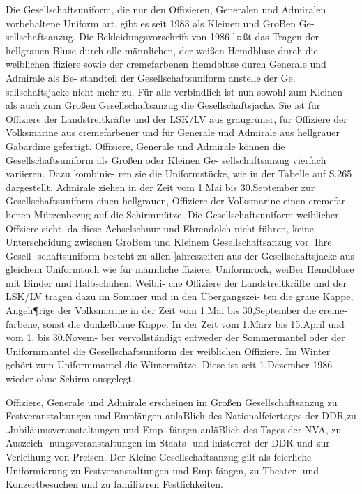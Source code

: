 

Die Gesellschaftsuniform, die nur den Offizieren,
Generalen und Admiralen vorbehaltene Uniform
art, gibt es seit 1983 als Kleinen und GroBen Ge-
sellschaftsanzug. Die Bekleidungsvorschrift von 1986 l¤ßt das Tragen der hellgrauen Bluse durch
alle männlichen, der weißen Hemdbluse durch die
weiblichen ffiziere sowie der cremefarbenen
Hemdbluse durch Generale und Admirale als Be-
standteil der Gesellschaftsuniform anstelle der Ge.
sellschaftsjacke nicht mehr zu. Für alle verbindlich
ist nun sowohl zum Kleinen als auch zum Großen
Gesellschaftsanzug die Gesellschaftsjacke. Sie ist
für Offiziere der Landstreitkräfte und der LSK/LV
aus graugrüner, für Offiziere der Volksmarine aus
cremefarbener und für Generale und Admirale aus
hellgrauer Gabardine gefertigt.
Offiziere, Generale und Admirale können die
Gesellschaftsuniform als Großen oder Kleinen Ge-
sellschaftsanzug vierfach variieren. Dazu kombinie-
ren sie die Uniformstücke, wie in der Tabelle auf
S.265 dargestellt.
Admirale ziehen in der Zeit vom 1.Mai bis
30.September zur Gesellschaftsuniform einen hellgrauen, Offiziere der Volksmarine einen cremefar-
benen Mützenbezug auf die Schirmmütze.
Die Gesellschaftsuniform weiblicher Offziere
sieht, da diese Achselschnur und Ehrendolch nicht
führen, keine Unterscheidung zwischen GroBem
und Kleinem Gesellschaftsanzug vor. Ihre Gesell-
schaftsuniform besteht zu allen ]ahreszeiten aus der
Gesellschaftsjacke aus gleichem Uniformtuch wie
für männliche ffiziere, Uniformrock, weiBer
Hemdbluse mit Binder und Halbschuhen. Weibli-
che Offiziere der Landstreitkräfte und der LSK/LV
tragen dazu im Sommer und in den Übergangszei-
ten die graue Kappe, Angeh¶rige der Volksmarine
in der Zeit vom 1.Mai bis 30,September die creme-
farbene, sonst die dunkelblaue Kappe. In der Zeit
vom 1.März bis 15.April und vom 1. bis 30.Novem-
ber vervollständigt entweder der Sommermantel
oder der Uniformmantel die Gesellschaftsuniform
der weiblichen Offiziere. Im Winter gehört zum
Uniformmantel die Wintermütze. Diese ist seit
1.Dezember 1986 wieder ohne Schirm ausgelegt.

Offiziere, Generale und Admirale erscheinen im
Großen Gesellschaftsanzug zu Festveranstaltungen
und Empfängen anlaBlich des Nationalfeiertages
der DDR,zu .Jubiläumsveranstaltungen und Emp-
fängen anläBlich des Tages der NVA, zu Auszeich-
nungsveranstaltungen im Staats- und inisterrat
der DDR und zur Verleihung von Preisen.
Der Kleine Gesellschaftsanzug gilt als feierliche
Uniformierung zu Festveranstaltungen und Emp
fängen, zu Theater- und Konzertbesuchen und zu
famili¤ren Festlichkeiten.